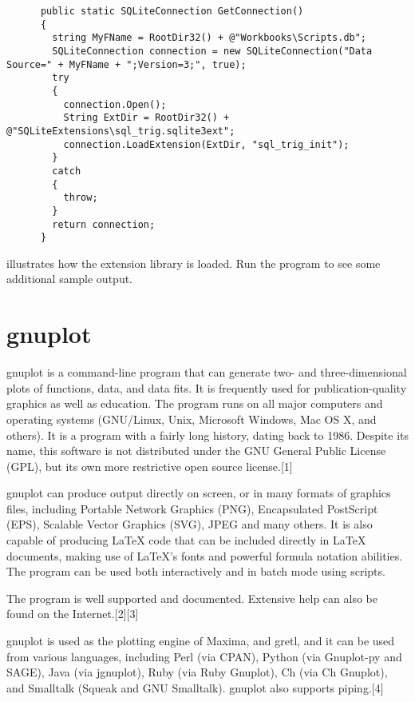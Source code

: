 \begin{lstlisting}
      public static SQLiteConnection GetConnection()
      {
        string MyFName = RootDir32() + @"Workbooks\Scripts.db";
        SQLiteConnection connection = new SQLiteConnection("Data Source=" + MyFName + ";Version=3;", true);
        try
        {
          connection.Open();
          String ExtDir = RootDir32() + @"SQLiteExtensions\sql_trig.sqlite3ext";
          connection.LoadExtension(ExtDir, "sql_trig_init");
        }
        catch
        {
          throw;
        }
        return connection;
      }
\end{lstlisting}
illustrates how the extension library is loaded. Run the program to see some additional sample output.











\newpage
\section{gnuplot}
gnuplot is a command-line program that can generate two- and three-dimensional plots of functions, data, and data fits. It is frequently used for publication-quality graphics as well as education. The program runs on all major computers and operating systems (GNU/Linux, Unix, Microsoft Windows, Mac OS X, and others). It is a program with a fairly long history, dating back to 1986. Despite its name, this software is not distributed under the GNU General Public License (GPL), but its own more restrictive open source license.[1]

\vpara
gnuplot can produce output directly on screen, or in many formats of graphics files, including Portable Network Graphics (PNG), Encapsulated PostScript (EPS), Scalable Vector Graphics (SVG), JPEG and many others. It is also capable of producing LaTeX code that can be included directly in LaTeX documents, making use of LaTeX's fonts and powerful formula notation abilities. The program can be used both interactively and in batch mode using scripts.

\vpara
The program is well supported and documented. Extensive help can also be found on the Internet.[2][3]

\vpara
gnuplot is used as the plotting engine of Maxima, and gretl, and it can be used from various languages, including Perl (via CPAN), Python (via Gnuplot-py and SAGE), Java (via jgnuplot), Ruby (via Ruby Gnuplot), Ch (via Ch Gnuplot), and Smalltalk (Squeak and GNU Smalltalk). gnuplot also supports piping.[4]

